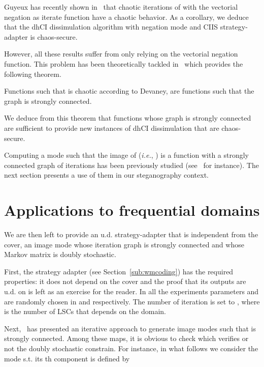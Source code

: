 \documentclass{comjnl}
\begin{document}
Guyeux has recently shown in~\cite{GuyeuxThese10}  that chaotic
iterations of  with  the
vectorial negation  as  iterate  function 
have   a  chaotic  behavior.
As a corollary, we deduce that the dhCI  dissimulation algorithm 
with negation mode and  CIIS strategy-adapter is chaos-secure.

However, all these results suffer from only relying on the vectorial
negation function. This problem has been theoretically tackled 
in~\cite{GuyeuxThese10} which provides the  following theorem.

\begin{theorem}
\label{Th:Caracterisation des  IC chaotiques} Functions  such that   is chaotic according to  Devaney, are functions
such that the graph  is strongly connected.
\end{theorem}
\noindent We deduce from this theorem that functions whose  
graph is strongly connected are sufficient to provide new instances of 
dhCI dissimulation that are chaos-secure.


Computing a mode  such that the image of  (\textit{i.e.}, ) 
is a function with a strongly connected graph of iterations 
has been previously studied (see~\cite{bcgr11:ip} for instance). 
The next section presents a use of them in our steganography context. 

















\section{Applications to frequential domains}
\label{sec:applications}
We are then left to provide an u.d. strategy-adapter that is independent
from the cover, an image mode  whose iteration
graph  is strongly connected and whose Markov
matrix is doubly stochastic.

First, the  strategy adapter (see Section~\ref{sub:wmcoding})
has the required properties:
it does not depend on the cover and the proof that its outputs
are u.d. on  
is left as an exercise for the reader.
In all the experiments parameters  and  are randomly 
chosen in  and 
respectively.
The number of iteration is set to , where  is the number of LSCs 
that depends on the domain.  
 
Next,~\cite{bcgr11:ip} has presented an iterative approach to generate image
modes  such that  is strongly connected. Among these
maps, it is obvious to check which verifies or not the doubly
stochastic constrain.
For instance, in what follows we consider the mode
 s.t. its th component is
defined by
\end{document}
